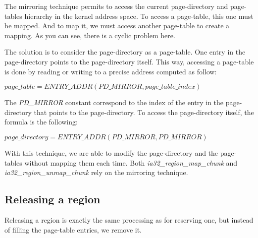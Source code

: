 The mirroring technique permits to access the current page-directory
and page-tables hierarchy in the kernel address space. To access a
page-table, this one must be mapped. And to map it, we must access
another page-table to create a mapping. As you can see, there is a
cyclic problem here.

The solution is to consider the page-directory as a page-table. One
entry in the page-directory points to the page-directory itself. This
way, accessing a page-table is done by reading or writing to a precise
address computed as follow:

$page\_table = ENTRY\_ADDR(PD\_MIRROR, page\_table\_index)$

The \textit{PD\_MIRROR} constant correspond to the index of the entry
in the page-directory that points to the page-directory. To access the
page-directory itself, the formula is the following:

$page\_directory = ENTRY\_ADDR(PD\_MIRROR, PD\_MIRROR)$

With this technique, we are able to modify the page-directory and the
page-tables without mapping them each time. Both
\textit{ia32\_region\_map\_chunk} and
\textit{ia32\_region\_unmap\_chunk} rely on the mirroring technique.

%
%

\subsection{Releasing a region}

Releasing a region is exactly the same processing as for reserving
one, but instead of filling the page-table entries, we remove it.

